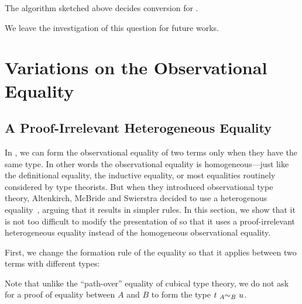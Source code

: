\begin{conjecture}
  The algorithm sketched above decides conversion for \SetoidCCplus.
\end{conjecture}

We leave the investigation of this question for future works.

\section{Variations on the Observational Equality}
\label{sec:heterogeneous}

\subsection{A Proof-Irrelevant Heterogeneous Equality}

In \SetoidCC, we can form the observational 
equality of two terms only when they have the same type. 
% 
In other words the observational equality is homogeneous---just like the 
definitional equality, the inductive equality, or most equalities routinely 
considered by type theorists.
% 
But when they introduced observational type theory, Altenkirch, McBride and 
Swierstra decided to use a heterogenous 
equality~, arguing that it results in simpler
rules.
% 
In this section, we show that it is not too difficult to modify the 
presentation of \SetoidCC so that it uses a proof-irrelevant heterogeneous 
equality instead of the homogeneous observational equality.

% 
First, we change the formation rule of the equality so that it applies between
two terms with different types:
% 

Note that unlike the ``path-over'' equality of cubical type theory, we do not 
ask for a proof of equality between \( A \) and \( B \) to form the type
\( \Heteq{t}{A}{u}{B} \).

